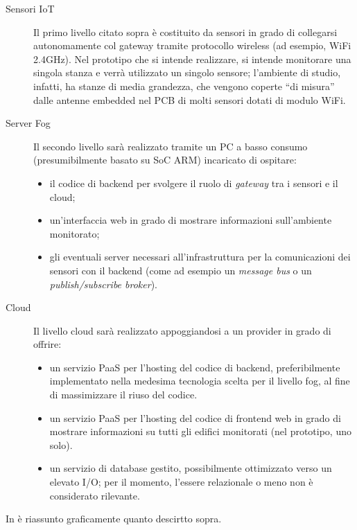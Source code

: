 \begin{description}
  \item[Sensori IoT]
    Il primo livello citato sopra è costituito da sensori in grado di collegarsi autonomamente col gateway tramite protocollo wireless (ad esempio, WiFi 2.4GHz).
    Nel prototipo che si intende realizzare, si intende monitorare una singola stanza e verrà utilizzato un singolo sensore;
    l'ambiente di studio, infatti, ha stanze di media grandezza, che vengono coperte ``di misura'' dalle antenne embedded nel PCB di molti sensori dotati di modulo WiFi.
  \item[Server Fog] %
    Il secondo livello sarà realizzato tramite un PC a basso consumo (presumibilmente basato su SoC ARM) incaricato di ospitare:
    \begin{itemize}
      \item il codice di backend per svolgere il ruolo di \emph{gateway} tra i sensori e il cloud;
      \item un'interfaccia web in grado di mostrare informazioni sull'ambiente monitorato;
      \item gli eventuali server necessari all'infrastruttura per la comunicazioni dei sensori con il backend (come ad esempio un \emph{message bus} o un \emph{publish/subscribe broker}).
    \end{itemize}
  \item[Cloud]
    Il livello cloud sarà realizzato appoggiandosi a un provider in grado di offrire:
    \begin{itemize}
      \item
        un servizio PaaS per l'hosting del codice di backend,
        preferibilmente implementato nella medesima tecnologia scelta per il livello fog, al fine di massimizzare il riuso del codice.
      \item
        un servizio PaaS per l'hosting del codice di frontend web in grado di mostrare informazioni su tutti gli edifici monitorati (nel prototipo, uno solo).
      \item
        un servizio di database gestito, possibilmente ottimizzato verso un elevato I/O\@;
        per il momento, l'essere relazionale o meno non è considerato rilevante.
    \end{itemize}
\end{description}

In  è riassunto graficamente quanto descirtto sopra.

